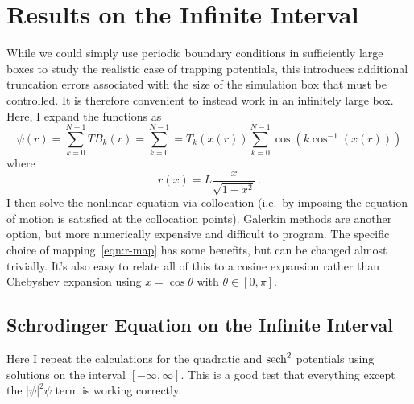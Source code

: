 \documentclass{revtex4}
\begin{document}
\section{Results on the Infinite Interval}
While we could simply use periodic boundary conditions in sufficiently large boxes to study the realistic case of trapping potentials, this introduces additional truncation errors associated with the size of the simulation box that must be controlled.  It is therefore convenient to instead work in an infinitely large box.  Here, I expand the functions as
\begin{equation}
  \psi(r) = \sum_{k=0}^{N-1} TB_{k}(r) = \sum_{k=0}^{N-1} = T_k(x(r)) \sum_{k=0}^{N-1} \cos(k\cos^{-1}(x(r)))
\end{equation}
where
\begin{equation}\label{eqn:r-map}
  r(x) = L\frac{x}{\sqrt{1-x^2}} \, .
\end{equation}
I then solve the nonlinear equation via collocation (i.e.\ by imposing the equation of motion is satisfied at the collocation points).  Galerkin methods are another option, but more numerically expensive and difficult to program.  The specific choice of mapping~\eqref{eqn:r-map} has some benefits, but can be changed almost trivially.  It's also easy to relate all of this to a cosine expansion rather than Chebyshev expansion using $x=\cos\theta$ with $\theta \in [0,\pi]$.

\subsection{Schrodinger Equation on the Infinite Interval}
Here I repeat the calculations for the quadratic and ${\rm sech}^2$ potentials using solutions on the interval $[-\infty,\infty]$.
This is a good test that everything except the $\left|\psi\right|^2\psi$ term is working correctly.
\end{document}
